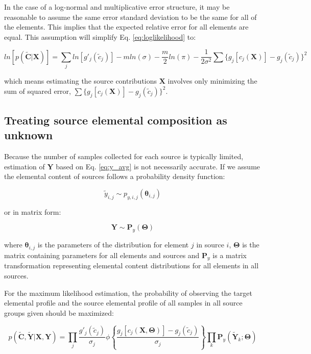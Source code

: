 In the case of a log-normal and multiplicative error structure, it may be reasonable to assume the same error standard deviation to be the same for all of the elements. This implies that the expected relative error for all elements are equal. This assumption will simplify Eq. \eqref{eq:loglikelihood} to:

\begin{equation}\label{eq:loglikelihood-eqstd}
    ln[p(\mathbf{\tilde C}|\mathbf{X})] = \sum_j ln[g'_j(\tilde c_j)] - m ln(\sigma) - \frac{m}{2}ln(\pi) -\frac{1}{{2\sigma^2}}\sum \{g_j[c_j(\mathbf{X})]-g_j(\tilde c_j)\}^2
\end{equation}

which means estimating the source contributions $\mathbf{X}$ involves only minimizing the sum of squared error, $\sum \{g_j[c_j(\mathbf{X})]-g_j(\tilde c_j)\}^2$.

\subsection{Treating source elemental composition as unknown}
Because the number of samples collected for each source is typically limited, estimation of $\textbf{Y}$ based on Eq. \eqref{eq:y_avg} is not necessarily accurate. If we assume the elemental content of sources follows a probability density function:

\begin{equation}
    \tilde{y}_{i,j} \sim p_{y,i,j}(\bm{\theta}_{i,j})
\end{equation}

or in matrix form:

\begin{equation}
    \mathbf{Y} \sim \mathbf{P}_{y}(\bm{\Theta})
\end{equation}

where $\bm\theta_{i,j}$ is the parameters of the distribution for element $j$ in source $i$, $\bm{\Theta}$ is the matrix containing parameters for all elements and sources and $\mathbf{P}_{y}$ is a matrix transformation representing elemental content distributions for all elements in all sources.

For the maximum likelihood estimation, the probability of observing the target elemental profile and the source elemental profile of all samples in all source groups given should be maximized:

\begin{equation}\label{eq:loglikelihood-with-y}
    p(\mathbf{\tilde C},\mathbf{\tilde Y}|\mathbf{X},\mathbf{Y}) = \prod_j \frac{g'_j(\tilde c_j)}{\sigma_j}\phi\left\{\frac{g_j[c_j(\mathbf{X},\mathbf{\Theta})]-g_j(\tilde c_j)}{\sigma_j}\right\}\prod_k \mathbf{P}_y(\mathbf{\tilde Y}_k;\bm{\Theta})
\end{equation}

